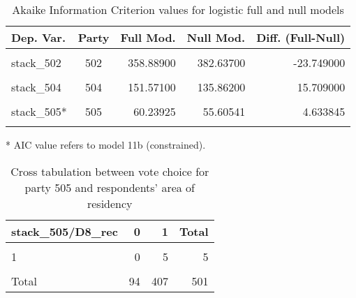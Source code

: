 \documentclass[
]{article}
\begin{document}
\begin{table}[!h]

\caption{\label{tab:unnamed-chunk-42}Akaike Information Criterion values for logistic full and null models 
        \label{table:logit_aic_cy}}
\centering
\begin{threeparttable}
\begin{tabular}[t]{lcrrr}
\toprule
Dep. Var. & Party & Full Mod. & Null Mod. & Diff. (Full-Null)\\
\midrule
\cellcolor{gray!6}{stack\_501} & \cellcolor{gray!6}{501} & \cellcolor{gray!6}{264.62700} & \cellcolor{gray!6}{285.99700} & \cellcolor{gray!6}{-21.370000}\\
stack\_502 & 502 & 358.88900 & 382.63700 & -23.749000\\
\cellcolor{gray!6}{stack\_503} & \cellcolor{gray!6}{503} & \cellcolor{gray!6}{233.62800} & \cellcolor{gray!6}{228.82500} & \cellcolor{gray!6}{4.803000}\\
stack\_504 & 504 & 151.57100 & 135.86200 & 15.709000\\
\cellcolor{gray!6}{stack\_505} & \cellcolor{gray!6}{505} & \cellcolor{gray!6}{63.43800} & \cellcolor{gray!6}{55.60500} & \cellcolor{gray!6}{7.832000}\\
\addlinespace
stack\_505* & 505 & 60.23925 & 55.60541 & 4.633845\\
\cellcolor{gray!6}{stack\_507} & \cellcolor{gray!6}{507} & \cellcolor{gray!6}{115.46200} & \cellcolor{gray!6}{116.26300} & \cellcolor{gray!6}{-0.800000}\\
\bottomrule
\end{tabular}
\begin{tablenotes}[para]
\item[*] AIC value refers to model 11b (constrained).
\end{tablenotes}
\end{threeparttable}
\end{table}

\begin{table}

\caption{\label{tab:unnamed-chunk-43}Cross tabulation between vote choice for party 505 and respondents' area of residency 
                   \label{table:crosstab_1_cy}}
\centering
\begin{tabular}[t]{l|r|r|r}
\hline
stack\_505/D8\_rec & 0 & 1 & Total\\
\hline
\cellcolor{gray!6}{0} & \cellcolor{gray!6}{84} & \cellcolor{gray!6}{354} & \cellcolor{gray!6}{438}\\
\hline
1 & 0 & 5 & 5\\
\hline
\cellcolor{gray!6}{NA} & \cellcolor{gray!6}{10} & \cellcolor{gray!6}{48} & \cellcolor{gray!6}{58}\\
\hline
Total & 94 & 407 & 501\\
\hline
\end{tabular}
\end{table}
\end{document}
